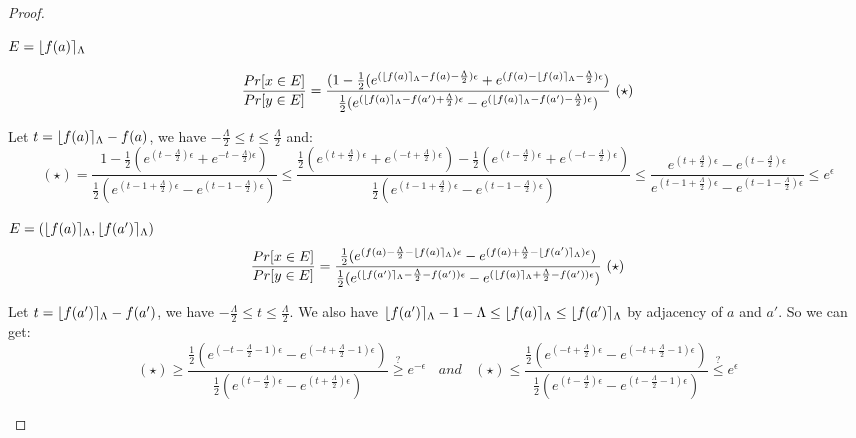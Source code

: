 \documentclass[a4paper,11pt]{article}
\begin{document}
\begin{proof}
\begin{itemize}
	
	\item[\textbf{case}] $E = \lfloor f(a) \rceil_{\Lambda}$

	\[
	\frac{Pr[x \in E]}{Pr[y \in E]} 
	= \frac{(1 - {\frac{1}{2}(
				e^{(\round{f(a)}_{\Lambda} - f(a) - \frac{\Lambda}{2})\epsilon}
				+ e^{(f(a) - \round{f(a)}_{\Lambda} -\frac{\Lambda}{2})\epsilon})}
			}
			{\frac{1}{2}(
				e^{(\round{f(a)}_{\Lambda} - f(a') + \frac{\Lambda}{2})\epsilon}
				- e^{(\round{f(a)}_{\Lambda} - f(a') - \frac{\Lambda}{2})\epsilon})}~(\star)
	\]

	Let $t = \lfloor f(a) \rceil_{\Lambda} - f(a)$, we have $-\frac{\Lambda}{2} \leq t \leq \frac{\Lambda}{2} $ and:
	\[
	(\star) = \frac{1 - {\frac{1}{2}(
				e^{(t - \frac{\Lambda}{2})\epsilon}
				+ e^{-t -\frac{\Lambda}{2})\epsilon})}
			}
			{\frac{1}{2}(
				e^{(t - 1 + \frac{\Lambda}{2})\epsilon}
				- e^{(t - 1 - \frac{\Lambda}{2})\epsilon})}
	\leq \frac{\frac{1}{2}(
				e^{(t + \frac{\Lambda}{2})\epsilon}
				+ e^{(-t +\frac{\Lambda}{2})\epsilon}) 
				- \frac{1}{2}(
				e^{(t - \frac{\Lambda}{2})\epsilon}
				+ e^{(-t -\frac{\Lambda}{2})\epsilon})
			}
			{\frac{1}{2}(
				e^{(t - 1 + \frac{\Lambda}{2})\epsilon}
				- e^{(t - 1 - \frac{\Lambda}{2})\epsilon})}
	\leq \frac{
				e^{(t + \frac{\Lambda}{2})\epsilon} 
				-
				e^{(t - \frac{\Lambda}{2})\epsilon}
			}
			{
				e^{(t - 1 + \frac{\Lambda}{2})\epsilon}
				- e^{(t - 1 - \frac{\Lambda}{2})\epsilon}
			}	
	\leq e^{\epsilon}
	\]

	{\color{red}
	\item[\textbf{case}] $E = (\lfloor f(a) \rceil_{\Lambda}, \lfloor f(a') \rceil_{\Lambda})$
	\[
	\frac{Pr[x \in E]}{Pr[y \in E]} 
	= \frac{
			\frac{1}{2}(
				e^{(f(a) - \frac{\Lambda}{2} - \round{f(a)}_{\Lambda})\epsilon}
				- e^{(f(a) + \frac{\Lambda}{2} - \round{f(a')}_{\Lambda})\epsilon})
			}
			{
			\frac{1}{2}(
				e^{(\round{f(a')}_{\Lambda} - \frac{\Lambda}{2} - f(a'))\epsilon}
				- e^{(\round{f(a)}_{\Lambda} + \frac{\Lambda}{2}  - f(a'))\epsilon})
			} ~ (\star)
	\]

	Let $t = \lfloor f(a') \rceil_{\Lambda} - f(a')$, we have $-\frac{\Lambda}{2} \leq t \leq \frac{\Lambda}{2} $. We also have $\lfloor f(a') \rceil_{\Lambda} - 1 - \Lambda \leq \lfloor f(a) \rceil_{\Lambda} \leq \lfloor f(a') \rceil_{\Lambda}$ by adjacency of $a$ and $a'$. So we can get:
	\[
	(\star) \geq \frac{
			\frac{1}{2}(
				e^{(-t - \frac{\Lambda}{2} - 1)\epsilon}
				- e^{(-t +\frac{\Lambda}{2} - 1)\epsilon})
			}
			{
			\frac{1}{2}(
				e^{(t - \frac{\Lambda}{2})\epsilon}
				- e^{(t +\frac{\Lambda}{2})\epsilon})
			}
	\stackrel{?}{\geq} e^{-\epsilon}
	~~~~and~~~~
	(\star) \leq \frac{
			\frac{1}{2}(
				e^{(-t + \frac{\Lambda}{2})\epsilon}
				- e^{(-t + \frac{\Lambda}{2} - 1)\epsilon})
			}
			{
			\frac{1}{2}(
				e^{(t - \frac{\Lambda}{2})\epsilon}
				- e^{(t - \frac{\Lambda}{2} - 1)\epsilon})
			}
	\stackrel{?}{\leq} e^{\epsilon}
	\]

}
\end{itemize}
\end{proof}
\end{document}

